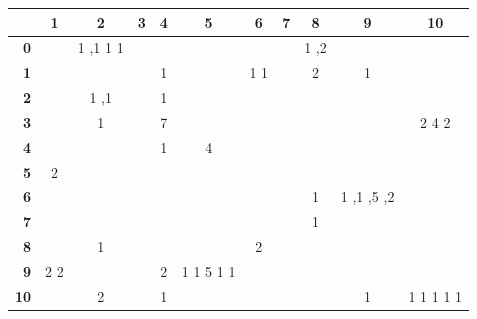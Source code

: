 \documentclass{article}
\begin{document}
\begin{table}
\centering
\begin{tabular}{r|cccccccccc}
&{\bf1}&{\bf2}&{\bf3}&{\bf4}&{\bf5}&{\bf6}&{\bf7}&{\bf8}&{\bf9}&{\bf10}\\
\hline
{\bf 0}&&
1%
,1%
1%
1%
&&&&&&
1%
,2%
&&\\
{\bf 1}&&&&
1%
&&
1%
1%
&&
2%
&
1%
&\\
{\bf 2}&&
1%
,1%
&&
1%
&&&&&&\\
{\bf 3}&&
1%
&&
7%
&&&&&&
2%
4%
2%
\\
{\bf 4}&&&&
1%
&
4%
&&&&&\\
{\bf 5}&
2%
&&&&&&&&&\\
{\bf 6}&&&&&&&&
1%
&
1%
,1%
,5%
,2%
&\\
{\bf 7}&&&&&&&&
1%
&&\\
{\bf 8}&&
1%
&&&&
2%
&&&&\\
{\bf 9}&
2%
2%
&&&
2%
&
1%
1%
5%
1%
1%
&&&&&\\
{\bf 10}&&
2%
&&
1%
&&&&&
1%
&
1%
1%
1%
1%
1%

\end{tabular}
\end{table}
\end{document}
